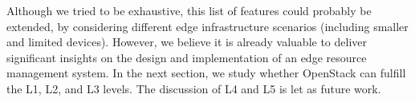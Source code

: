 Although we tried to be exhaustive, this list of features could
probably be extended, \eg by considering different edge
infrastructure scenarios (\eg including smaller and limited devices).
However, we believe it is already valuable to deliver significant
insights on the design and implementation of an edge resource management
system. In the next section, we study whether OpenStack can fulfill the L1, L2,
and L3 levels. The discussion of L4 and L5 is let as future work.

